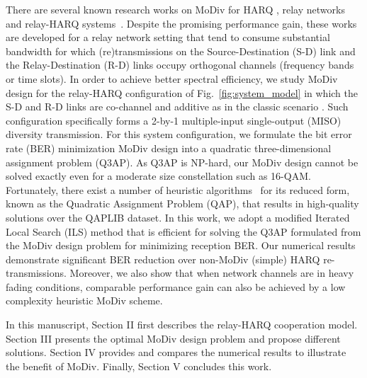 \documentclass[journal]{IEEEtran}
\begin{document}
There are several known research works on MoDiv for HARQ
\cite{harvind2005symbol}, relay networks~\cite{seddik2008trans,
khormuji2008rate} and relay-HARQ systems~\cite{kim2009design, ryu2011ber}.
Despite the promising performance gain, these works are developed for a relay
network setting that tend to consume substantial bandwidth for which
(re)transmissions on the Source-Destination (S-D) link and the Relay-Destination
(R-D) links occupy orthogonal channels (frequency bands or time slots). In order
to achieve better spectral efficiency, we study MoDiv design for the relay-HARQ
configuration of Fig.~\ref{fig:system_model} in which the S-D and R-D links are
co-channel and additive as in the classic scenario \cite{cover1979capacity,
nabar2004fading}. Such configuration specifically forms a 2-by-1
multiple-input single-output (MISO) diversity transmission.
For this system configuration, we formulate the bit error rate (BER)
minimization MoDiv design into a quadratic three-dimensional assignment problem (Q3AP). 
As Q3AP is NP-hard, our MoDiv design cannot be solved exactly 
even for a moderate size constellation such as 16-QAM. Fortunately, there exist
a number of heuristic algorithms~\cite{benlic2015memetic} for its reduced form,
known as the Quadratic Assignment Problem (QAP), that results in high-quality
solutions over the QAPLIB dataset. In this work, we adopt a modified Iterated
Local Search (ILS) method that is efficient for solving the Q3AP formulated from
the MoDiv design problem for minimizing reception BER. Our numerical results
demonstrate significant BER reduction over non-MoDiv (simple) HARQ re-transmissions.
Moreover, we also show that when network channels are in heavy fading
conditions, comparable performance gain can also be achieved by a low complexity
heuristic MoDiv scheme.

In this manuscript, Section II first describes the relay-HARQ cooperation model.
Section III presents the optimal MoDiv design problem and propose different
solutions. Section IV provides and compares the numerical results to illustrate
the benefit of MoDiv. Finally, Section V concludes this work. 
\end{document}
